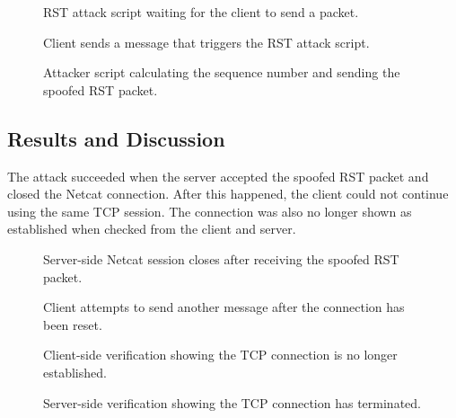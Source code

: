 \begin{figure}[!t]
\centering
{}
\caption{RST attack script waiting for the client to send a packet.}
\label{fig:rst_attack1}
\end{figure}

\begin{figure}[!t]
\centering
{}
\caption{Client sends a message that triggers the RST attack script.}
\label{fig:rst_message6}
\end{figure}

\begin{figure}[!t]
\centering
{}
\caption{Attacker script calculating the sequence number and sending the spoofed RST packet.}
\label{fig:rst_attack2}
\end{figure}

\subsection{Results and Discussion}

The attack succeeded when the server accepted the spoofed RST packet and closed the Netcat connection. After this happened, the client could not continue using the same TCP session. The connection was also no longer shown as established when checked from the client and server.

\begin{figure}[!t]
\centering
{}
\caption{Server-side Netcat session closes after receiving the spoofed RST packet.}
\label{fig:rst_server_close}
\end{figure}

\begin{figure}[!t]
\centering
{}
\caption{Client attempts to send another message after the connection has been reset.}
\label{fig:rst_message7}
\end{figure}

\begin{figure}[!t]
\centering
{}
\caption{Client-side verification showing the TCP connection is no longer established.}
\label{fig:rst_verify1}
\end{figure}

\begin{figure}[!t]
\centering
{}
\caption{Server-side verification showing the TCP connection has terminated.}
\label{fig:rst_verify2}
\end{figure}

